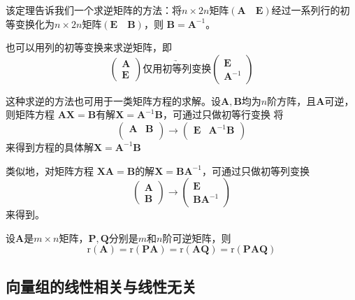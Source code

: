 \begin{remark}
    该定理告诉我们一个求逆矩阵的方法：将$n\times 2n$矩阵$(\boldsymbol{A}\quad\boldsymbol{E})$经过一系列行的初等变换化为$n\times 2n$矩阵$(\boldsymbol{E}\quad\boldsymbol{B})$，则
    $\boldsymbol{B}=\boldsymbol{A}^{-1}$。

    也可以用列的初等变换来求逆矩阵，即
    $$\left(\begin{array}{c}
        \boldsymbol{A}\\
        \boldsymbol{E}        
    \end{array}\right) \underrightarrow {\text{仅用初等列变换}}\left(\begin{array}{c}
        \boldsymbol{E}\\
        \boldsymbol{A}^{-1}        
    \end{array}\right)$$

    这种求逆的方法也可用于一类矩阵方程的求解。设$\boldsymbol{A},\boldsymbol{B}$均为$n$阶方阵，且$\boldsymbol{A}$可逆，则矩阵方程
    $\boldsymbol{A}\boldsymbol{X}=\boldsymbol{B}$有解$\boldsymbol{X}=\boldsymbol{A}^{-1}\boldsymbol{B}$，可通过只做初等行变换
    将$$\left(\begin{array}{cc}
        \boldsymbol{A} & \boldsymbol{B}\\
    \end{array}\right) \longrightarrow  \left(\begin{array}{cc}
        \boldsymbol{E} & \boldsymbol{A}^{-1}\boldsymbol{B}\\
    \end{array}\right)$$来得到方程的具体解$\boldsymbol{X}=\boldsymbol{A}^{-1}\boldsymbol{B}$

    类似地，对矩阵方程 $\boldsymbol{X}\boldsymbol{A}=\boldsymbol{B}$的解$\boldsymbol{X}=\boldsymbol{B}\boldsymbol{A}^{-1}$，可通过只做初等列变换
    $$\left(\begin{array}{c}
        \boldsymbol{A} \\
        \boldsymbol{B}
    \end{array}\right) \longrightarrow  \left(\begin{array}{c}
        \boldsymbol{E} \\
        \boldsymbol{B}\boldsymbol{A}^{-1}
    \end{array}\right)$$来得到。
\end{remark}

\begin{theorem}
    设$\boldsymbol{A}$是$m\times n$矩阵，$\boldsymbol{P},\boldsymbol{Q}$分别是$m$和$n$阶可逆矩阵，则
    $$\mathrm{r}(\boldsymbol{A})=\mathrm{r}(\boldsymbol{P}\boldsymbol{A})=\mathrm{r}(\boldsymbol{A}\boldsymbol{Q})=\mathrm{r}(\boldsymbol{P}\boldsymbol{A}\boldsymbol{Q})$$
\end{theorem}

\subsection{向量组的线性相关与线性无关}
